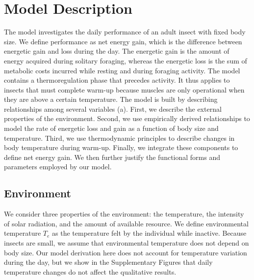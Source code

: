 \section*{Model Description}


The model investigates the daily performance of an adult insect with fixed body size.
We define performance as net energy gain, which is the difference between energetic gain and loss during the day.
The energetic gain is the amount of energy acquired during solitary foraging, whereas the energetic loss is the sum of metabolic costs incurred while resting and during foraging activity.
The model contains a thermoregulation phase that precedes activity.
It thus applies to insects that must complete warm-up because muscles are only operational when they are above a certain temperature.
The model is built by describing relationships among several variables (a).
First, we describe the external properties of the environment.
Second, we use empirically derived relationships to model the rate of energetic loss and gain as a function of body size and temperature.
Third, we use thermodynamic principles to describe changes in body temperature during warm-up.
Finally, we integrate these components to define net energy gain.
We then further justify the functional forms and parameters employed by our model.

\subsection*{Environment}

We consider three properties of the environment: the temperature, the intensity of solar radiation, and the amount of available resource.
We define environmental temperature $T_e$ as the temperature felt by the individual while inactive.
Because insects are small, we assume that environmental temperature does not depend on body size. %
Our model derivation here does not account for temperature variation during the day, but we show in the Supplementary Figures that daily temperature changes do not affect the qualitative results.


